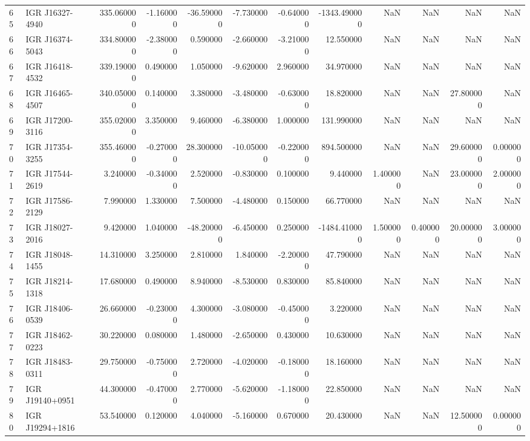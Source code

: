 \begin{tabular}{llrrrrrrrrrr}
65 & IGR J16327-4940 & 335.060000 & -1.160000 & -36.590000 & -7.730000 & -0.640000 & -1343.490000 & NaN & NaN & NaN & NaN \\
66 & IGR J16374-5043 & 334.800000 & -2.380000 & 0.590000 & -2.660000 & -3.210000 & 12.550000 & NaN & NaN & NaN & NaN \\
67 & IGR J16418-4532 & 339.190000 & 0.490000 & 1.050000 & -9.620000 & 2.960000 & 34.970000 & NaN & NaN & NaN & NaN \\
68 & IGR J16465-4507 & 340.050000 & 0.140000 & 3.380000 & -3.480000 & -0.630000 & 18.820000 & NaN & NaN & 27.800000 & NaN \\
69 & IGR J17200-3116 & 355.020000 & 3.350000 & 9.460000 & -6.380000 & 1.000000 & 131.990000 & NaN & NaN & NaN & NaN \\
70 & IGR J17354-3255 & 355.460000 & -0.270000 & 28.300000 & -10.050000 & -0.220000 & 894.500000 & NaN & NaN & 29.600000 & 0.000000 \\
71 & IGR J17544-2619 & 3.240000 & -0.340000 & 2.520000 & -0.830000 & 0.100000 & 9.440000 & 1.400000 & NaN & 23.000000 & 2.000000 \\
72 & IGR J17586-2129 & 7.990000 & 1.330000 & 7.500000 & -4.480000 & 0.150000 & 66.770000 & NaN & NaN & NaN & NaN \\
73 & IGR J18027-2016 & 9.420000 & 1.040000 & -48.200000 & -6.450000 & 0.250000 & -1484.410000 & 1.500000 & 0.400000 & 20.000000 & 3.000000 \\
74 & IGR J18048-1455 & 14.310000 & 3.250000 & 2.810000 & 1.840000 & -2.200000 & 47.790000 & NaN & NaN & NaN & NaN \\
75 & IGR J18214-1318 & 17.680000 & 0.490000 & 8.940000 & -8.530000 & 0.830000 & 85.840000 & NaN & NaN & NaN & NaN \\
76 & IGR J18406-0539 & 26.660000 & -0.230000 & 4.300000 & -3.080000 & -0.450000 & 3.220000 & NaN & NaN & NaN & NaN \\
77 & IGR J18462-0223 & 30.220000 & 0.080000 & 1.480000 & -2.650000 & 0.430000 & 10.630000 & NaN & NaN & NaN & NaN \\
78 & IGR J18483-0311 & 29.750000 & -0.750000 & 2.720000 & -4.020000 & -0.180000 & 18.160000 & NaN & NaN & NaN & NaN \\
79 & IGR J19140+0951 & 44.300000 & -0.470000 & 2.770000 & -5.620000 & -1.180000 & 22.850000 & NaN & NaN & NaN & NaN \\
80 & IGR J19294+1816 & 53.540000 & 0.120000 & 4.040000 & -5.160000 & 0.670000 & 20.430000 & NaN & NaN & 12.500000 & 0.000000 \\

\end{tabular}
